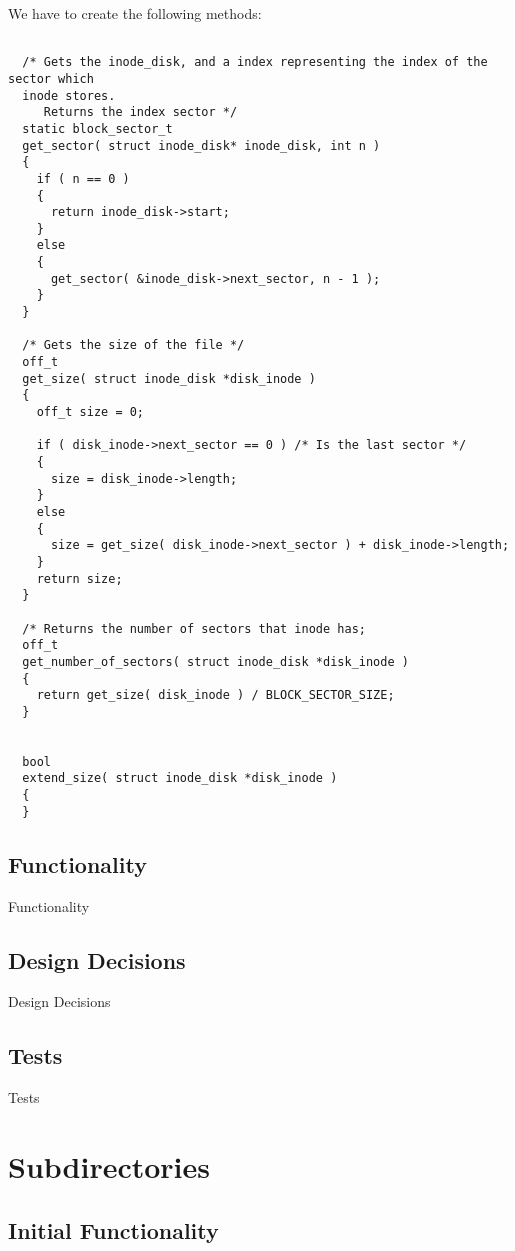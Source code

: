 We have to create the following methods:
\begin{lstlisting}

  /* Gets the inode_disk, and a index representing the index of the sector which 
  inode stores.
     Returns the index sector */
  static block_sector_t
  get_sector( struct inode_disk* inode_disk, int n )
  {
    if ( n == 0 )
    {
      return inode_disk->start;
    }
    else
    {
      get_sector( &inode_disk->next_sector, n - 1 );
    }
  }

  /* Gets the size of the file */
  off_t
  get_size( struct inode_disk *disk_inode )
  {
    off_t size = 0;
    
    if ( disk_inode->next_sector == 0 ) /* Is the last sector */
    {
      size = disk_inode->length;
    }
    else
    {
      size = get_size( disk_inode->next_sector ) + disk_inode->length;
    }
    return size;
  }

  /* Returns the number of sectors that inode has;
  off_t
  get_number_of_sectors( struct inode_disk *disk_inode )
  {
    return get_size( disk_inode ) / BLOCK_SECTOR_SIZE;
  }

  
  bool
  extend_size( struct inode_disk *disk_inode )
  {
  }

\end{lstlisting}

  

\subsection{Functionality}

Functionality
  

\subsection{Design Decisions}

Design Decisions
  

\subsection{Tests}

Tests

\section{Subdirectories}
\subsection{Initial Functionality}

